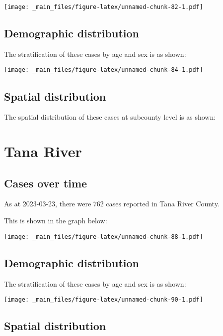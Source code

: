 \documentclass[
]{book}
\begin{document}
\texttt{[image: \_main\_files/figure-latex/unnamed-chunk-82-1.pdf]}

\hypertarget{demographic-distribution-13}{%
\section{Demographic distribution}\label{demographic-distribution-13}}

The stratification of these cases by age and sex is as shown:

\texttt{[image: \_main\_files/figure-latex/unnamed-chunk-84-1.pdf]}

\hypertarget{spatial-distribution-13}{%
\section{Spatial distribution}\label{spatial-distribution-13}}

The spatial distribution of these cases at subcounty level is as shown:

\hypertarget{tana-river}{%
\chapter{Tana River}\label{tana-river}}

\hypertarget{cases-over-time-14}{%
\section{Cases over time}\label{cases-over-time-14}}

As at 2023-03-23, there were 762 cases reported in Tana River County.

This is shown in the graph below:

\texttt{[image: \_main\_files/figure-latex/unnamed-chunk-88-1.pdf]}

\hypertarget{demographic-distribution-14}{%
\section{Demographic distribution}\label{demographic-distribution-14}}

The stratification of these cases by age and sex is as shown:

\texttt{[image: \_main\_files/figure-latex/unnamed-chunk-90-1.pdf]}

\hypertarget{spatial-distribution-14}{%
\section{Spatial distribution}\label{spatial-distribution-14}}
\end{document}

